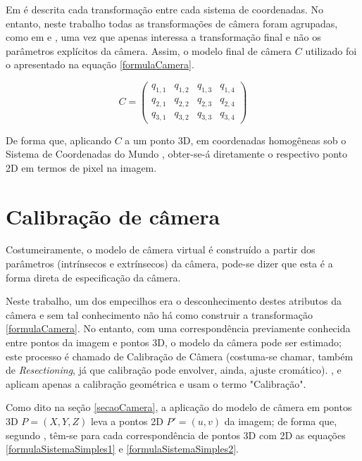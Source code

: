 		Em \cite{foto3D} é descrita cada transformação entre cada sistema de coordenadas. No entanto, neste trabalho todas as transformações de câmera foram agrupadas, como em \cite{juizVirtual} e \cite{fundCompGraf}, uma vez que apenas interessa a transformação final e não os parâmetros explícitos da câmera. Assim, o modelo final de câmera $C$ utilizado foi o apresentado na equação \ref{formulaCamera}.
		
		\begin{equation}
			C = \begin{pmatrix}
						q_{1,1} & q_{1,2} & q_{1,3} & q_{1,4} \\
						q_{2,1} & q_{2,2} & q_{2,3} & q_{2,4} \\
						q_{3,1} & q_{3,2} & q_{3,3} & q_{3,4}
					\end{pmatrix}
			\label{formulaCamera}
		\end{equation}
		
		De forma que, aplicando $C$ a um ponto 3D, em coordenadas homogêneas \cite{fundCompGraf2} sob o Sistema de Coordenadas do Mundo \cite{foto3D}, obter-se-á diretamente o respectivo ponto 2D em termos de pixel na imagem.
	
	\section{Calibração de câmera}
		\label{secaoCalibracao}
	
		Costumeiramente, o modelo de câmera virtual é construído a partir dos parâmetros (intrínsecos e extrínsecos) \cite{fundCompGraf} da câmera, pode-se dizer que esta é a forma direta de especificação da câmera. 
		
		Neste trabalho, um dos empecilhos era o desconhecimento destes atributos da câmera e sem tal conhecimento não há como construir a transformação \ref{formulaCamera}. No entanto, com uma correspondência previamente conhecida entre pontos da imagem e pontos 3D, o modelo da câmera pode ser estimado; este processo é chamado de Calibração de Câmera (costuma-se chamar, também de \textit{Resectioning}, já que calibração pode envolver, ainda, ajuste cromático). \cite{juizVirtual}, \cite{szenbergDoutorado} e \cite{lectureCameraCalibration} aplicam apenas a calibração geométrica e usam o termo "Calibração".
		
		Como dito na seção \ref{secaoCamera}, a aplicação do modelo de câmera em pontos 3D $P = (X, Y, Z)$ leva a pontos 2D $P' = (u, v)$ da imagem; de forma que, segundo \cite{juizVirtual}, têm-se para cada correspondência de pontos 3D com 2D as equações \ref{formulaSistemaSimples1} e \ref{formulaSistemaSimples2}.
	
